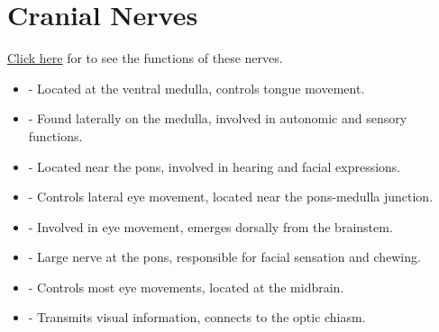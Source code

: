 \section*{Cranial Nerves}
\hyperlink{}{Click here} for to see the functions of these nerves.
\begin{itemize}
    \item {} - Located at the ventral medulla, controls tongue movement.
    \item {} - Found laterally on the medulla, involved in autonomic and sensory functions.
    \item {} - Located near the pons, involved in hearing and facial expressions.
    \item {} - Controls lateral eye movement, located near the pons-medulla junction.
    \item {} - Involved in eye movement, emerges dorsally from the brainstem.
    \item {} - Large nerve at the pons, responsible for facial sensation and chewing.
    \item {} - Controls most eye movements, located at the midbrain.
    \item {} - Transmits visual information, connects to the optic chiasm.
\end{itemize}